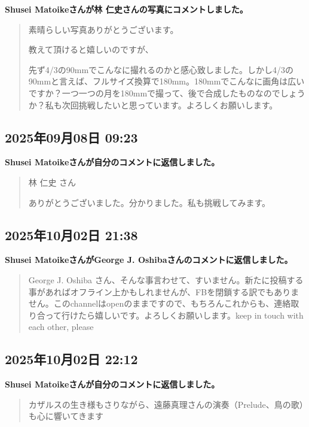\textbf{Shusei Matoikeさんが林 仁史さんの写真にコメントしました。}

\begin{quote}
素晴らしい写真ありがとうございます。

教えて頂けると嬉しいのですが、

先ず4/3の90mmでこんなに撮れるのかと感心致しました。しかし4/3の90mmと言えば、フルサイズ換算で180mm。180mmでこんなに画角は広いですか？一つ一つの月を180mmで撮って、後で合成したものなのでしょうか？私も次回挑戦したいと思っています。よろしくお願いします。
\end{quote}

\subsection*{2025年09月08日 09:23}

\textbf{Shusei Matoikeさんが自分のコメントに返信しました。}

\begin{quote}
林 仁史 さん

ありがとうございました。分かりました。私も挑戦してみます。
\end{quote}

\subsection*{2025年10月02日 21:38}

\textbf{Shusei MatoikeさんがGeorge J. Oshibaさんのコメントに返信しました。}

\begin{quote}
George J. Oshiba さん、そんな事言わせて、すいません。新たに投稿する事があればオフライン上かもしれませんが、FBを閉鎖する訳でもありません。このchannelはopenのままですので、もちろんこれからも、連絡取り合って行けたら嬉しいです。よろしくお願いします。keep in touch with each other, please
\end{quote}

\subsection*{2025年10月02日 22:12}

\textbf{Shusei Matoikeさんが自分のコメントに返信しました。}

\begin{quote}
カザルスの生き様もさりながら、遠藤真理さんの演奏（Prelude、鳥の歌）も心に響いてきます
\end{quote}

